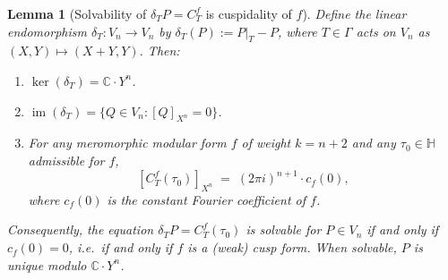 \documentclass[11pt]{article}
\newtheorem{lemma}[theorem]{Lemma}
\numberwithin{equation}{section}  %
\newcommand{\HH}{\mathbb{H}}
\newcommand{\CC}{\mathbb{C}}
\begin{document}
\begin{lemma}[Solvability of $\delta_T P = C^f_T$ is cuspidality of $f$]\label{lem:solvability-cuspidality}
Define the linear endomorphism $\delta_T \colon V_n \to V_n$ by
$\delta_T(P) := P|_T - P$, where $T \in \Gamma$ acts on $V_n$ as
$(X, Y) \mapsto (X + Y, Y)$.  Then:
\begin{enumerate}[label=(\alph*),leftmargin=2em]\itemsep0.25em
\item $\ker(\delta_T) = \CC \cdot Y^n$.
\item $\operatorname{im}(\delta_T) = \{Q \in V_n : [Q]_{X^n} = 0\}$.
\item For any meromorphic modular form $f$ of weight $k = n + 2$ and any
  $\tau_0 \in \HH$ admissible for $f$,
\begin{equation}\label{eq:CfT-Xn-coeff}
  [C^f_T(\tau_0)]_{X^n} \;=\; (2\pi i)^{n+1} \cdot c_f(0),
\end{equation}
where $c_f(0)$ is the constant Fourier coefficient of $f$.
\end{enumerate}
Consequently, the equation $\delta_T P = C^f_T(\tau_0)$ is solvable for
$P \in V_n$ if and only if $c_f(0) = 0$, i.e.\ if and only if $f$ is a
(weak) cusp form.  When solvable, $P$ is unique modulo $\CC \cdot Y^n$.
\end{lemma}
\end{document}
